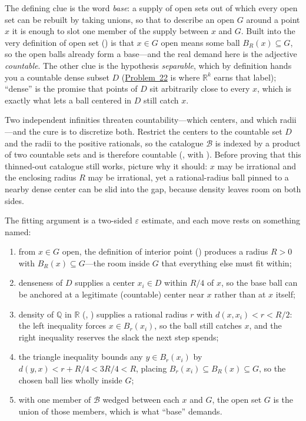 \documentclass[main.tex]{subfiles}
\begin{document}
\begin{Reflection}
The defining clue is the word \emph{base}: a supply of open sets out of which every open set can be
rebuilt by taking unions, so that to describe an open $G$ around a point $x$ it is enough to slot one
member of the supply between $x$ and $G$. Built into the very definition of open set
() is that $x\in G$ open means some ball $B_R(x)\subseteq G$, so the open balls already
form a base---and the real demand here is the adjective \emph{countable}. The other clue is the
hypothesis \emph{separable}, which by definition hands you a countable dense subset $D$
(\hyperlink{prob:22}{Problem~22} is where $\mathbb R^k$ earns that label); ``dense'' is the promise
that points of $D$ sit arbitrarily close to every $x$, which is exactly what lets a ball centered in
$D$ still catch $x$.

Two independent infinities threaten countability---which centers, and which radii---and the cure is
to discretize both. Restrict the centers to the countable set $D$ and the radii to the positive
rationals, so the catalogue $\mathcal B$ is indexed by a product of two countable sets and is
therefore countable (, with
). Before proving that this
thinned-out catalogue still works, picture why it should: $x$ may be irrational and the enclosing
radius $R$ may be irrational, yet a rational-radius ball pinned to a nearby dense center can be slid
into the gap, because density leaves room on both sides.

The fitting argument is a two-sided $\varepsilon$ estimate, and each move rests on something named:
\begin{enumerate}[leftmargin=1.7em,itemsep=3pt,topsep=2pt,label=\textnormal{(\arabic*)}]
  \item from $x\in G$ open, the definition of interior point () produces a radius $R>0$
        with $B_R(x)\subseteq G$---the room inside $G$ that everything else must fit within;
  \item denseness of $D$ supplies a center $x_i\in D$ within $R/4$ of $x$, so the base ball can be
        anchored at a legitimate (countable) center near $x$ rather than at $x$ itself;
  \item density of $\mathbb Q$ in $\mathbb R$ (, )
        supplies a rational radius $r$ with $d(x,x_i)<r<R/2$: the left inequality forces $x\in
        B_r(x_i)$, so the ball still catches $x$, and the right inequality reserves the slack the next
        step spends;
  \item the triangle inequality bounds any $y\in B_r(x_i)$ by $d(y,x)<r+R/4<3R/4<R$, placing
        $B_r(x_i)\subseteq B_R(x)\subseteq G$, so the chosen ball lies wholly inside $G$;
  \item with one member of $\mathcal B$ wedged between each $x$ and $G$, the open set $G$ is the union
        of those members, which is what ``base'' demands.
\end{enumerate}


\end{Reflection}
\end{document}
